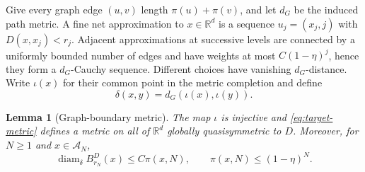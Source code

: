\documentclass[11pt,reqno]{amsart}
\theoremstyle{plain}
\newtheorem{lemma}[theorem]{Lemma}
\theoremstyle{definition}
\theoremstyle{remark}
\newcommand{\R}{\mathbb R}
\newcommand{\diam}{\operatorname{diam}}
\newcommand{\1}{\mathbf{1}}
\newcommand{\bd}{B^{D}}
\begin{document}
Give every graph edge $(u,v)$ length $\pi(u)+\pi(v)$, and let $d_G$ be the induced path metric. A fine net approximation to $x\in\R^d$ is a sequence $u_j=(x_j,j)$ with $D(x,x_j)<r_j$. Adjacent approximations at successive levels are connected by a uniformly bounded number of edges and have weights at most $C(1-\eta)^j$, hence they form a $d_G$-Cauchy sequence. Different choices have vanishing $d_G$-distance. Write $\iota(x)$ for their common point in the metric completion and define
\begin{equation}\label{eq:target-metric}
\delta(x,y)=d_G(\iota(x),\iota(y)).
\end{equation}

\begin{lemma}[Graph-boundary metric]\label{lem:graph}
The map $\iota$ is injective and \eqref{eq:target-metric} defines a metric on all of $\R^d$ globally quasisymmetric to $D$. Moreover, for $N\ge1$ and $x\in\mathcal A_N$,
\begin{equation}\label{eq:pi-diam}
\diam_\delta\bd_{r_N}(x)\le C\pi(x,N),\qquad \pi(x,N)\le(1-\eta)^N.
\end{equation}
\end{lemma}
\end{document}
